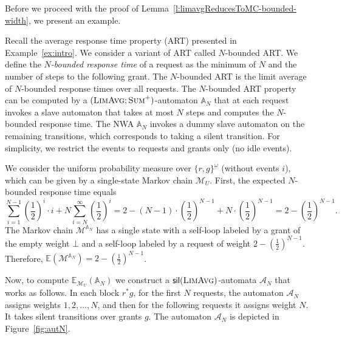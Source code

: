 \documentclass{lmcs}
\newcommand{\nestedA}{\mathbb{A}}
\newcommand{\silent}[1]{\mathsf{sil}({#1})}
\newcommand{\fsum}{\textsc{Sum}}
\newcommand{\flimavg}{\textsc{LimAvg}}
\newcommand{\aut}{\mathcal{A}}
\newcommand{\expected}{\mathbb{E}}
\newcommand{\markov}{\mathcal{M}}
\begin{document}
Before we proceed with the proof of Lemma~\ref{l:limavgReducesToMC-bounded-width}, we present an example.

\begin{exa}\label{ex:N-ART}
Recall the average response time property (ART) presented in Example~\ref{ex:intro}.
We consider a variant of ART called $N$-bounded ART\@. We define the \emph{$N$-bounded response time} of a request as the minimum of $N$ and the number of steps to the following grant.  The $N$-bounded ART is the limit average of $N$-bounded response times over all requests.
The $N$-bounded ART property can be computed by a $(\flimavg;\fsum^+)$-automaton $\nestedA_N$ that at each request invokes a slave automaton that takes at most $N$ steps and computes the $N$-bounded response time.
The NWA $\nestedA_N$ invokes a dummy slave automaton on the remaining transitions, which corresponds to taking a silent transition. For simplicity, we restrict the events to requests and grants only (no idle events).

We consider the uniform probability measure over ${\{r,g\}}^{\omega}$ (without events $i$), which can be given by a single-state Markov chain $\markov_U$. First, the expected $N$-bounded response time equals
\[ \sum_{i=1}^{N-1} {\left(\frac{1}{2}\right)}^{i} \cdot i + N \sum_{i=N}^{\infty} {\left(\frac{1}{2}\right)}^i = 	2 - (N-1)\cdot {\left(\frac{1}{2}\right)}^{N-1} + N \cdot  {\left(\frac{1}{2}\right)}^{N-1} = 2 -  {\left(\frac{1}{2}\right)}^{N-1}.\]
The Markov chain $\markov^{\nestedA_N}$ has a single state with a  self-loop labeled by a grant of the empty weight $\bot$ and a self-loop labeled by a request of weight $ 2 - {(\frac{1}{2})}^{N-1}$. Therefore, $\expected(\markov^{\nestedA_N}) = 2 - {(\frac{1}{2})}^{N-1}$.

Now, to compute $\expected_{\markov_U}(\nestedA_N)$ we construct a $\silent{\flimavg}$-automata $\aut_N$ that works as follows.
In each block $r^* g$, for the first $N$ requests, the automaton $\aut_N$ assigns weights $1, 2, \ldots, N$, and then
for the following requests it assigns weight $N$.
 It takes silent transitions over grants $g$. The automaton $\aut_N$ is depicted in Figure~\ref{fig:autN}.

\begin{figure}
\begin{center}
\end{center}
\end{figure}
\end{exa}
\end{document}
